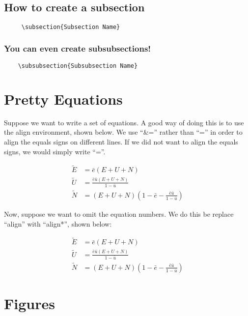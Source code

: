 \documentclass[11pt]{article}
\begin{document}
\subsection{How to create a subsection}
\begin{verbatim}
     \subsection{Subsection Name}
\end{verbatim}

\subsubsection{You can even create subsubsections!}
\begin{verbatim}
    \subsubsection{Subsubsection Name}
\end{verbatim}


\section{Pretty Equations}

Suppose we want to write a set of equations. A good way of doing this is to use the align environment, shown below. We use ``\&='' rather than ``='' in order to align the equals signs on different lines. If we did not want to align the equals signs, we would simply write ``=''.

\begin{align}
    \tilde{E} &= \bar{e}(E+U+N)\\
    \tilde{U} &= \frac{\bar{e}\bar{u}(E+U+N)}{1-\bar{u}}\\
    \tilde{N} &= (E+U+N)(1-\bar{e}-\frac{\bar{e}\bar{u}}{1-\bar{u}})
\end{align}

Now, suppose we want to omit the equation numbers. We do this be replace ``align'' with ``align*'', shown below:

\begin{align*}
    \tilde{E} &= \bar{e}(E+U+N)\\
    \tilde{U} &= \frac{\bar{e}\bar{u}(E+U+N)}{1-\bar{u}}\\
    \tilde{N} &= (E+U+N)(1-\bar{e}-\frac{\bar{e}\bar{u}}{1-\bar{u}})
\end{align*}

\section{Figures}
\end{document}
